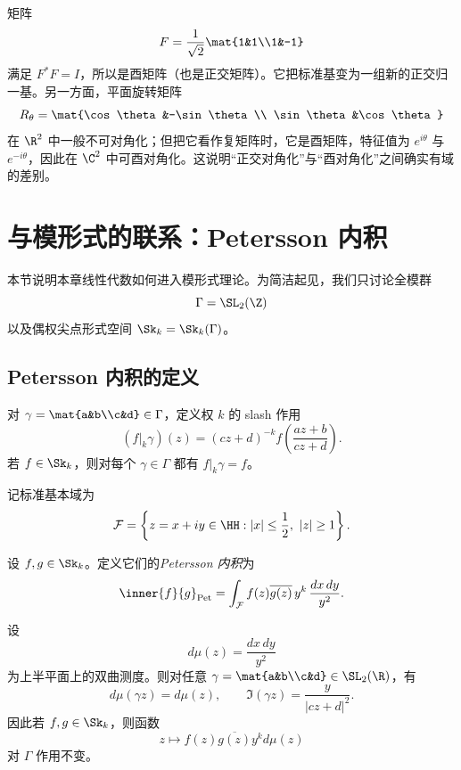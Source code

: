 \begin{example}
矩阵
\[
F=\frac{1}{\sqrt2}\mat{1&1\\1&-1}
\]
满足 $F^*F=I$，所以是酉矩阵（也是正交矩阵）。它把标准基变为一组新的正交归一基。另一方面，平面旋转矩阵
\[
R_\theta=\mat{\cos\theta&-\sin\theta\\ \sin\theta&\cos\theta}
\]
在 $\R^2$ 中一般不可对角化；但把它看作复矩阵时，它是酉矩阵，特征值为 $e^{i\theta}$ 与 $e^{-i\theta}$，因此在 $\C^2$ 中可酉对角化。这说明“正交对角化”与“酉对角化”之间确实有域的差别。
\end{example}

\section{与模形式的联系：Petersson 内积}

本节说明本章线性代数如何进入模形式理论。为简洁起见，我们只讨论全模群
\[
\Gamma=\SL_2(\Z)
\]
以及偶权尖点形式空间 $\Sk_k=\Sk_k(\Gamma)$。

\subsection{Petersson 内积的定义}

对 $\gamma=\mat{a&b\\c&d}\in\Gamma$，定义权 $k$ 的 slash 作用
\[
(f|_k\gamma)(z)=(cz+d)^{-k}f\!\left(\frac{az+b}{cz+d}\right).
\]
若 $f\in \Sk_k$，则对每个 $\gamma\in\Gamma$ 都有 $f|_k\gamma=f$。

记标准基本域为
\[
\mathcal{F}=\left\{z=x+iy\in\HH:|x|\le \frac12,\ |z|\ge 1\right\}.
\]

\begin{definition}
设 $f,g\in \Sk_k$。定义它们的\emph{Petersson 内积}为
\[
\inner{f}{g}_{\mathrm{Pet}}=\int_{\mathcal{F}} f(z)\overline{g(z)}\,y^k\,\frac{dx\,dy}{y^2}.
\]
\end{definition}

\begin{lemma}
设
\[
d\mu(z)=\frac{dx\,dy}{y^2}
\]
为上半平面上的双曲测度。则对任意 $\gamma=\mat{a&b\\c&d}\in\SL_2(\R)$，有
\[
d\mu(\gamma z)=d\mu(z),\qquad \Im(\gamma z)=\frac{y}{|cz+d|^2}.
\]
因此若 $f,g\in \Sk_k$，则函数
\[
z\longmapsto f(z)\overline{g(z)}y^k d\mu(z)
\]
对 $\Gamma$ 作用不变。
\end{lemma}

